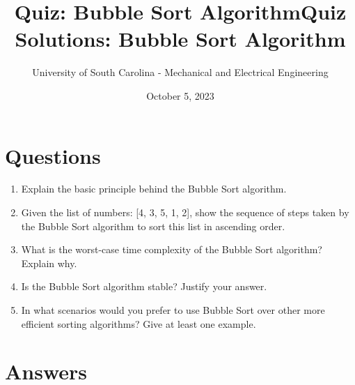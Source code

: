 \documentclass[12pt]{article}
\title{Quiz: Bubble Sort Algorithm}
\date{October 5, 2023}
\author{University of South Carolina - Mechanical and Electrical Engineering}
\begin{document}
\maketitle

\section*{Questions}

\begin{enumerate}
    \item Explain the basic principle behind the Bubble Sort algorithm.
    
    \item Given the list of numbers: [4, 3, 5, 1, 2], show the sequence of steps taken by the Bubble Sort algorithm to sort this list in ascending order.

    \item What is the worst-case time complexity of the Bubble Sort algorithm? Explain why.
    
    \item Is the Bubble Sort algorithm stable? Justify your answer.
    
    \item In what scenarios would you prefer to use Bubble Sort over other more efficient sorting algorithms? Give at least one example.
\end{enumerate}

\newpage

\title{Quiz Solutions: Bubble Sort Algorithm}
\maketitle

\section*{Answers}
\end{document}
